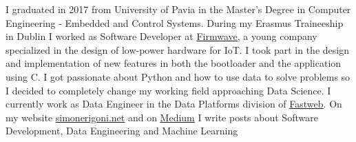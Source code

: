 \documentclass[9pt]{developercv} %
\begin{document}
\begin{minipage}[t]{0.5\textwidth} %
	\vspace{-\baselineskip} %
	
	I graduated in 2017 from University of Pavia in the Master's Degree in Computer Engineering - Embedded and Control Systems. During my Erasmus Traineeship in Dublin I worked as Software Developer at \underline{\href{https://iot.taoglas.com/}{Firmwave}}, a young company specialized in the design of low-power hardware for IoT. I took part in the design and implementation of new features in both the bootloader and the application using C. I got passionate about Python and how to use data to solve problems so I decided to completely change my working field approaching Data Science. I currently work as Data Engineer in the Data Platforms division of \underline{\href{https://www.fastweb.it/}{Fastweb}}. On my website \underline{\href{http://www.simonerigoni.net}{simonerigoni.net}} and on \underline{\href{https://medium.com/@simone.rigoni01}{Medium}} I write posts about Software Development, Data Engineering and Machine Learning
\end{minipage}
\hfill %
\begin{minipage}[t]{0.4\textwidth} %
	\vspace{-\baselineskip} %
	\begin{barchart}{5.5}
	\end{barchart}
\end{minipage}

\begin{center}
\end{center}


\end{document}
